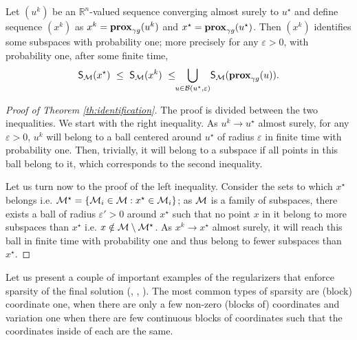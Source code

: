 \begin{theorem}\label{th:identification}
Let $(u^k)$ be an $\mathbb{R}^n$-valued sequence converging almost surely to $u^\star$ and define sequence $(x^k)$ as $x^k = \mathbf{prox}_{\gamma g}(u^k)$ and  $x^\star =  \mathbf{prox}_{\gamma g}(u^\star)$. Then $(x^k)$ identifies some subspaces with probability one; more precisely for any $\varepsilon>0$, with probability one, after some finite time,
\begin{equation}\label{eq:identification_result}
	 \mathsf{S}_{\mathcal{M}}(x^\star) ~\leq~ \mathsf{S}_{\mathcal{M}}(x^k) ~\leq\!\!\bigcup_{u\in\mathcal{B}(u^\star,\varepsilon)} \!\mathsf{S}_{\mathcal{M}}(\mathbf{prox}_{\gamma g}(u)).
\end{equation}
\end{theorem}
\begin{proof}[Proof of Theorem \ref{th:identification}]
The proof is divided between the two inequalities. We start with the right inequality. As $u^k \to u^\star$ almost surely, for any $\varepsilon>0$, $u^k$ will belong to a ball centered around $u^\star$ of radius $\varepsilon$ in finite time with probability one. Then, trivially, it will belong to a subspace if all points in this ball belong to it, which corresponds to the second inequality.

Let us turn now to the proof of the left inequality.  Consider the sets to which $x^\star$ belongs i.e. $\mathcal{M}^\star = \{ \mathcal{M}_i\in\mathcal{M} : x^\star \in \mathcal{M}_i \}$; as $\mathcal{M}$ is a family of subspaces, there exists a ball of radius $\varepsilon'>0$ around $x^\star$ such that no point $x$ in it belong to {more} subspaces than $x^\star$ i.e. $x \notin \mathcal{M} \setminus \mathcal{M}^\star$. As $x^k \to x^\star $ almost surely, it will reach this ball in finite time with probability one and thus belong to fewer subspaces than $x^\star$.
\end{proof}

Let us present a couple of important examples of the regularizers that enforce sparsity of the final solution (\cite{argyriou2013sparsity}, \cite{jenatton2011structured}, \cite{zhao2006grouped}). The most common types of sparsity are (block) coordinate one, when there are only a few non-zero (blocks of) coordinates and variation one when there are few continuous blocks of coordinates such that the coordinates inside of each are the same.

